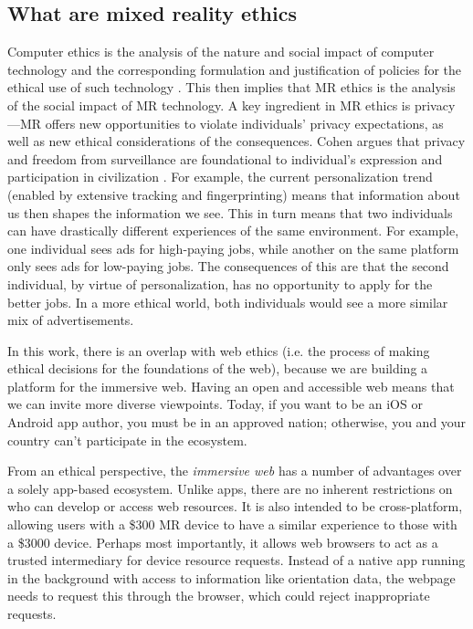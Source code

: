 \subsection{What are mixed reality ethics}\label{sec:ethics}

Computer ethics is the analysis of the nature and social impact of computer technology and the corresponding formulation and justification of policies for the ethical use of such technology \cite{moor1985computer}. This then implies that MR ethics is the analysis of the social impact of MR technology. A key ingredient in MR ethics is privacy---MR offers new opportunities to violate individuals' privacy expectations, as well as new ethical considerations of the consequences. Cohen argues that privacy and freedom from surveillance are foundational to individual's expression and participation in civilization \cite{cohen2012privacy}. For example, the current personalization trend (enabled by extensive tracking and fingerprinting) means that information about us then shapes the information we see. This in turn means that two individuals can have drastically different experiences of the same environment. For example, one individual sees ads for high-paying jobs, while another on the same platform only sees ads for low-paying jobs. The consequences of this are that the second individual, by virtue of personalization, has no opportunity to apply for the better jobs. In a more ethical world, both individuals would see a more similar mix of advertisements.

In this work, there is an overlap with web ethics (i.e. the process of making ethical decisions for the foundations of the web), because we are building a platform for the immersive web. Having an open and accessible web means that we can invite more diverse viewpoints. Today, if you want to be an iOS or Android app author, you must be in an approved nation; otherwise, you and your country can't participate in the ecosystem.

From an ethical perspective, the \emph{immersive web} has a number of advantages over a solely app-based ecosystem. Unlike apps, there are no inherent restrictions on who can develop or access web resources. It is also intended to be cross-platform, allowing users with a \$300 MR device to have a similar experience to those with a \$3000 device. Perhaps most importantly, it allows web browsers to act as a trusted intermediary for device resource requests. Instead of a native app running in the background with access to information like orientation data, the webpage needs to request this through the browser, which could reject inappropriate requests.

